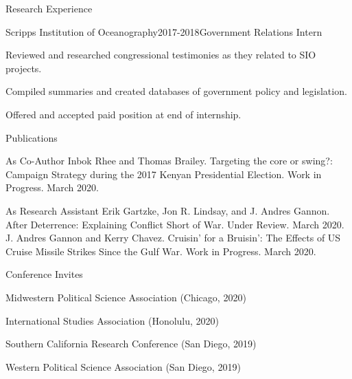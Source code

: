 \documentclass[10pt]{resume} %
\begin{document}
\begin{rSection}{Research Experience}
		\begin{rSubsection}{Scripps Institution of Oceanography}{2017-2018}{Government Relations Intern}{}
			\item Reviewed and researched congressional testimonies as they related to SIO projects.
			\item Compiled summaries and created databases of government policy and legislation.
			\item Offered and accepted paid position at end of internship.
		\end{rSubsection}
		
	\end{rSection}
	
	
	\begin{rSection}{Publications}
		\itemsep -5pt
		\begin{rSubsection}{}{}{As Co-Author}{}
			Inbok Rhee and Thomas Brailey. Targeting the core or swing?: Campaign Strategy during the 2017 Kenyan Presidential Election. Work in Progress. March 2020.
		\end{rSubsection}
		\begin{rSubsection}{}{}{As Research Assistant}{}
			Erik Gartzke, Jon R. Lindsay, and J. Andres Gannon. After Deterrence: Explaining Conflict Short of War. Under Review. March 2020. \\
			J. Andres Gannon and Kerry Chavez. Cruisin’ for a Bruisin’: The Effects of US Cruise Missile Strikes Since the Gulf War. Work in Progress. March 2020.
		\end{rSubsection}
	\end{rSection}
	
	\bigskip
	\begin{rSection}{Conference Invites}
		\itemsep -5pt
		\item Midwestern Political Science Association (Chicago, 2020)
		\item International Studies Association (Honolulu, 2020)
		\item Southern California Research Conference (San Diego, 2019)
		\item Western Political Science Association (San Diego, 2019)
	\end{rSection}
	
\end{document}
